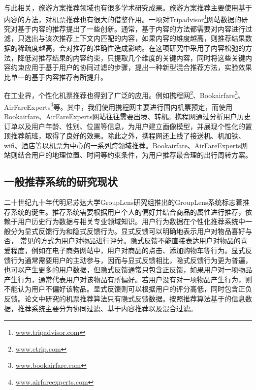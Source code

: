 与此相关，旅游方案推荐领域也有很多学术研究成果。旅游方案推荐主要使用基于内容的方法，对机票推荐也有很大的借鉴作用。一项对Tripadvisor\footnote{\url{www.tripadvisor.com}}网站数据的研究对基于内容的推荐提出了一些创新。通常，基于内容的方法都需要对内容进行过滤，只选出与该次推荐上下文内匹配的内容，如果内容的维度越高，则推荐结果数据的稀疏度越高，会对推荐的准确性造成影响。在这项研究中采用了内容松弛的方法，降低对推荐结果的内容约束，只提取几个维度的关键内容，同时将这些关键内容约束应用于基于用户的协同过滤的步骤，提出一种新型混合推荐方法，实验效果比单一的基于内容推荐有所提升。

在工业界，个性化机票推荐也得到了广泛的应用。例如携程网\footnote{\url{www.ctrip.com}}、Bookairfare\footnote{\url{www.bookairfare.com}}、AirFareExperts\footnote{\url{www.airfareexperts.com}}等。其中，我们使用携程网主要进行国内机票预定，而使用Bookairfare、AirFareExperts网站往往需要出境、转机。携程网通过分析用户历史订单以及用户年龄、性别、位置等信息，为用户建立画像模型，并展现个性化的置顶推荐航班，取得了良好的效果。除此之外，携程网还上线了接送机、机加铁、wifi、酒店等以机票为中心的一系列跨领域推荐。Bookairfare、AirFareExperts网站则结合用户的地理位置、时间等约束条件，为用户推荐最合理的出行周转方案。

\subsection{一般推荐系统的研究现状}

二十世纪九十年代明尼苏达大学GroupLens研究组推出的GroupLens系统\cite{konstan1997grouplens}标志着推荐系统的诞生。推荐系统需要根据用户个人的偏好并结合商品的属性进行推荐，依赖于用户历史行为数据与相关专业领域知识。用户行为数据在个性化推荐系统中一般分为显式反馈行为和隐式反馈行为\cite{oard1998implicit,lin2001characterized}。显式反馈可以明确地表示用户对物品喜好与否，
常见的方式为用户对物品进行评分。隐式反馈不能直接表达用户对物品的喜爱程度，例如在电子商务网站中，用户对商品的点击、添加购物车等行为。显式反馈行为通常需要用户的主动参与，因而与显式反馈相比，隐式反馈行为更为普遍，也可以产生更多的用户数据，但隐式反馈通常只包含正反馈，如果用户对一项物品产生行为，通常代表用户对该物品有所偏好。若用户没有对一项物品产生行为，则不能认为用户不偏好该物品。显式反馈则可以根据用户的评分高低，同时包含正负反馈。论文中研究的机票推荐算法只有隐式反馈数据。按照推荐算法基于的信息数据，推荐系统主要分为协同过滤\cite{breese1998empirical}、基于内容推荐\cite{pazzani1999framework,claypool1999combining}以及混合过滤\cite{soboroff1999combining}。
		
